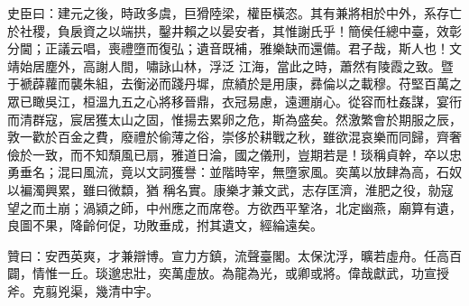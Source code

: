\begin{pinyinscope}
 史臣曰：建元之後，時政多虞，巨猾陸梁，權臣橫恣。其有兼將相於中外，系存亡於社稷，負扆資之以端拱，鑿井賴之以晏安者，其惟謝氏乎！簡侯任總中臺，效彰分閫；正議云唱，喪禮墮而復弘；遺音既補，雅樂缺而還備。君子哉，斯人也！文靖始居塵外，高謝人間，嘯詠山林，浮泛
 江海，當此之時，蕭然有陵霞之致。暨于褫薜蘿而襲朱組，去衡泌而踐丹墀，庶績於是用康，彞倫以之載穆。苻堅百萬之眾已瞰吳江，桓溫九五之心將移晉鼎，衣冠易慮，遠邇崩心。從容而杜姦謀，宴衎而清群寇，宸居獲太山之固，惟揚去累卵之危，斯為盛矣。然激繁會於期服之辰，敦一歡於百金之費，廢禮於偷薄之俗，崇侈於耕戰之秋，雖欲混哀樂而同歸，齊奢儉於一致，而不知頹風已扇，雅道日淪，國之儀刑，豈期若是！琰稱貞幹，卒以忠勇垂名；混曰風流，竟以文詞獲譽：並階時宰，無墮家風。奕萬以放肆為高，石奴以褊濁興累，雖曰微纇，猶
 稱名實。康樂才兼文武，志存匡濟，淮肥之役，勍寇望之而土崩；渦潁之師，中州應之而席卷。方欲西平鞏洛，北定幽燕，廟算有遺，良圖不果，降齡何促，功敗垂成，拊其遺文，經綸遠矣。



 贊曰：安西英爽，才兼辯博。宣力方鎮，流聲臺閣。太保沈浮，曠若虛舟。任高百闢，情惟一丘。琰邈忠壯，奕萬虛放。為龍為光，或卿或將。偉哉獻武，功宣授斧。克翦兇渠，幾清中宇。



\end{pinyinscope}